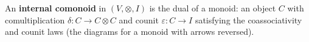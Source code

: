 An \textbf{internal comonoid} in $(V, \otimes, I)$ is the dual of a monoid: an object $C$ with comultiplication $\delta: C \rightarrow C \otimes C$ and counit $\varepsilon: C \rightarrow I$ satisfying the coassociativity and counit laws (the diagrams for a monoid with arrows reversed).